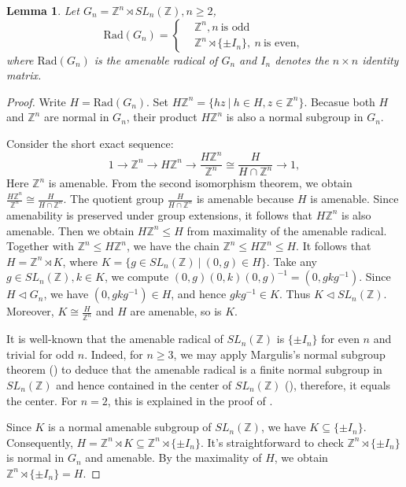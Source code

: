 \documentclass[12pt]{amsart}
\newtheorem{lem}[theorem]{Lemma}
\theoremstyle{definition}
\theoremstyle{remark}
\begin{document}
\begin{lem}\label{3.3}
Let $G_{n}=\mathbb{Z}^n\rtimes SL_n(\mathbb{Z}),n\ge 2$, 
\begin{equation*}
\text{Rad}(G_{n}) = 
\left\{
\begin{aligned}
&\mathbb{Z}^n ,  n~\text{is odd}\\
&\mathbb{Z}^n \rtimes \{\pm I_{n}\},\ n~\text{is even},
\end{aligned}
\right.
\end{equation*}
where $\text{Rad}(G_{n})$ is the amenable radical of $G_{n}$ and $I_{n}$ denotes the $n\times n$ identity matrix.
\end{lem}
\begin{proof}
Write $H=\text{Rad}(G_{n})$. Set $H\mathbb{Z}^n = \{hz\ |\ h\in H, z\in \mathbb{Z}^n \}$. Becasue both $H$ and $\mathbb{Z}^n$ are normal in $G_{n}$, their product $H\mathbb{Z}^n$ is also a normal subgroup in $G_{n}$.

Consider the short exact sequence:
\begin{equation*}
    1\longrightarrow \mathbb{Z}^n \longrightarrow H\mathbb{Z}^n \longrightarrow \frac{H\mathbb{Z}^n}{\mathbb{Z}^n} \cong \frac{H}{H\cap{\mathbb{Z}^n}} \longrightarrow 1,
\end{equation*}
Here $\mathbb{Z}^n$ is amenable. From the second isomorphism theorem, we obtain $\frac{H\mathbb{Z}^n}{\mathbb{Z}^n} \cong \frac{H}{H\cap{\mathbb{Z}^n}}$. The quotient group $\frac{H}{H\cap{\mathbb{Z}^n}}$ is amenable because $H$ is amenable. Since amenability is preserved under group extensions, it follows that $H\mathbb{Z}^n$ is also amenable. Then we obtain $H\mathbb{Z}^n \le H$ 
from maximality of the amenable radical. Together with $\mathbb{Z}^n\le H\mathbb{Z}^n$, we have the chain $\mathbb{Z}^n \le H\mathbb{Z}^n \le H$. It follows that $H= \mathbb{Z}^n \rtimes K $, where $K=\{g\in SL_{n}(\mathbb{Z})\ |\ (0,g)\in H\}$. Take any $g\in SL_{n}(\mathbb{Z}), k\in K$, we compute $(0,g)(0,k)(0,g)^{-1} = (0, gkg^{-1})$. Since $H\lhd G_n$, we have $(0, gkg^{-1})\in H$, and hence $ gkg^{-1} \in K$. Thus $K\lhd SL_{n}(\mathbb{Z})$. Moreover, $K \cong \frac{H}{\mathbb{Z}^n}$ and $H$ are amenable, so is $K$. 

It is well-known that the amenable radical of $SL_{n}(\mathbb{Z})$ is $\{\pm I_{n}\}$ for even $n$ and trivial for odd $n$. Indeed, for $n\geq 3$, we may apply Margulis's normal subgroup theorem (\cite[Chapter IV]{Margulis_book}) to deduce that the amenable radical is a finite normal subgroup in $SL_n(\mathbb{Z})$ and hence contained in the center of $SL_n(\mathbb{Z})$ (\cite[Section 17.1]{Morris_book}), therefore, it equals the center. For $n=2$, this is explained in the proof of \cite[Proposition 2.10]{jiangskalski}.

 Since $K$ is a normal amenable subgroup of $SL_{n}(\mathbb{Z})$, we have $K\subseteq \{\pm I_{n}\}$. Consequently, $H = \mathbb{Z}^n \rtimes K \subseteq \mathbb{Z}^n \rtimes \{\pm I_{n}\}$. It's straightforward to check $\mathbb{Z}^n \rtimes \{\pm I_{n}\}$ is normal in $G_{n}$ and amenable. By the maximality of $H$, we obtain $\mathbb{Z}^n \rtimes \{\pm I_{n}\} =H$. 
\end{proof}
\end{document}
